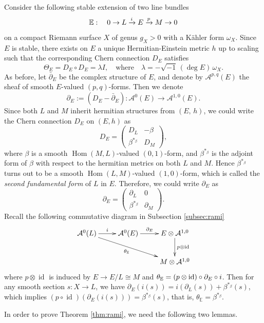 \documentclass[12pt]{article}
\begin{document}
Consider the following stable extension of two line bundles
\[ {\Bbb E}: \quad 0 \to L \xrightarrow{i} E \xrightarrow{p} M \to 0 \]
on a compact Riemann surface $X$ of genus $g_{X} > 0$ with a K\" ahler form $\omega_X$.
Since $E$ is stable, there exists on $E$ a unique Hermitian-Einstein metric $h$ up to scaling such that the corresponding Chern connection $D_{E}$ satisfies
\[ \Theta_{E} = D_{E} \circ D_{E} =  \lambda I, \quad\text{where}\quad \lambda= -\sqrt{-1} \,(\deg E) \,\omega_X. \]
As before, let $\bar{\partial}_{E}$ be the complex structure of $E$, and denote by $\mathcal{A}^{p,q}(E)$ the sheaf of smooth $E$-valued $(p, q)$-forms. Then we denote
\[ \partial_{E} := \left(D_{E} - \bar{\partial}_{E}\right) \colon \mathcal A^{0}(E) \to \mathcal A^{1,0}(E). \]
Since both $L$ and $M$ inherit hermitian structures from $(E,\, h)$, we could write the Chern connection $D_E$ on $(E,h)$ as
\[ D_{E} = \begin{pmatrix}
D_{L} &  - \beta \\
  \beta^{*_{\beta}}     &D_{M}
\end{pmatrix}, \]
where $\beta$ is a smooth $\operatorname{Hom}(M, L)$-valued $(0,1)$-form, and $\beta^{*_{\beta}}$ is the adjoint form of $\beta$ with respect to the hermitian metrics on both $L$ and $M$. Hence $\beta^{*_\beta}$ turns out to be a smooth $\operatorname{Hom}(L, M)$-valued $(1,0)$-form, which is called  the {\it second fundamental form} of $L$ in $E$.  Therefore, we could write $\partial_E$ as
\[ \partial_{E}= \begin{pmatrix}
\partial_{L} & 0 \\
  \beta^{*_{\beta}}     &\partial_{M}
\end{pmatrix}. \]
Recall the following commutative diagram in Subsection \ref{subsec:rami}
\[\xymatrix{
\mathcal A^{0}(L)\ar[r] ^-{i}\ar[drr]_-{\theta_{\Bbb E}} & \mathcal A^{0}(E)\ar[r] ^-{\partial_{E}} & E\otimes \mathcal{A}^{1,0}\ar[d]^-{p \otimes \operatorname{id}} \\
 & & M \otimes \mathcal{A}^{1,0}
}\]
where $p \otimes \operatorname{id}$ is induced by $E \rightarrow E/L \cong M$ and $\theta_{\Bbb E} = (p \otimes \operatorname{id}) \circ \partial_{E} \circ i$.
Then for any smooth section $s \colon X \to L$, we have $ \partial_{E}(i(s)) = i(\partial_{L}(s)) + \beta^{*_{\beta}}(s)$, which implies $(p\circ \operatorname{id})(\partial_{E}(i(s))) = \beta^{*_{\beta}}(s)$, that is, $\theta_{\mathbb E} = \beta^{*_{\beta}}$.

In order to prove Theorem \ref{thm:rami}, we need the following two lemmas.
\end{document}
